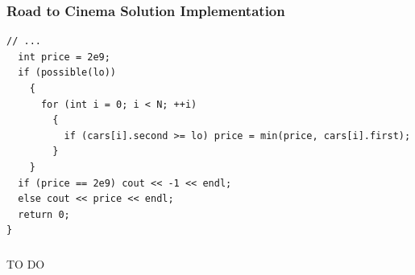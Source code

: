 \documentclass{beamer}
\newcommand{\codeforceslink}[2]{CodeForces (http://www.codeforces.com)
  problem: \href{#2}{\textcolor{blue}{#1}.}}
\newcounter{exo}
\newcommand{\exo}{
  \addtocounter{exo}{1}
  Exercice \arabic{exo}
}
\begin{document}
\begin{frame}[containsverbatim]
\frametitle{Road to Cinema Solution Implementation}
\scriptsize

\begin{lstlisting}[mathescape]
  // ...
  int price = 2e9;
  if (possible(lo))
    {
      for (int i = 0; i < N; ++i)
        {
          if (cars[i].second >= lo) price = min(price, cars[i].first);
        }
    }
  if (price == 2e9) cout << -1 << endl;
  else cout << price << endl;
  return 0;
}
\end{lstlisting}

\end{frame}


\ifanswers

\begin{frame}%
\frametitle{}

TO DO

\end{frame}

\begin{frame}[containsverbatim]
\frametitle{}
\scriptsize

\begin{lstlisting}[mathescape]
\end{lstlisting}

\end{frame}

\begin{frame}[containsverbatim]
\frametitle{}
\scriptsize

\begin{lstlisting}[mathescape]
\end{lstlisting}

\end{frame}

\begin{frame}[containsverbatim]
\frametitle{}
\scriptsize

\begin{lstlisting}[mathescape]
\end{lstlisting}

\end{frame}

\end{document}
